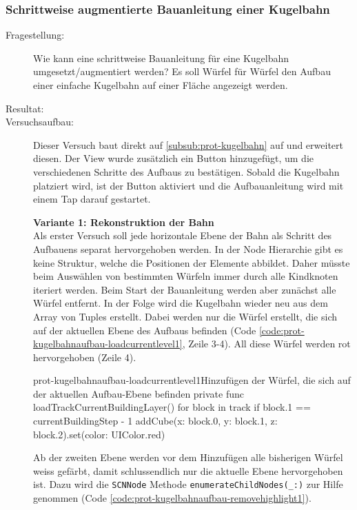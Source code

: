 \subsubsection{Schrittweise augmentierte Bauanleitung einer Kugelbahn}\label{subsub:prot-kugelbahnaufbau}
\begin{description}
	\item[Fragestellung:] Wie kann eine schrittweise Bauanleitung für eine Kugelbahn umgesetzt/augmentiert werden? Es soll Würfel für Würfel den Aufbau einer einfache Kugelbahn auf einer Fläche angezeigt werden.
	\item[Resultat:] 
	\item[Versuchsaufbau:] Dieser Versuch baut direkt auf \ref{subsub:prot-kugelbahn} auf und erweitert diesen. Der View wurde zusätzlich ein Button hinzugefügt, um die verschiedenen Schritte des Aufbaus zu bestätigen. Sobald die Kugelbahn platziert wird, ist der Button aktiviert und die Aufbauanleitung wird mit einem Tap darauf gestartet.

	\textbf{Variante 1: Rekonstruktion der Bahn}\\
	Als erster Versuch soll jede horizontale Ebene der Bahn als Schritt des Aufbauens separat hervorgehoben werden. In der Node Hierarchie gibt es keine Struktur, welche die Positionen der Elemente abbildet. Daher müsste beim Auswählen von bestimmten Würfeln immer durch alle Kindknoten iteriert werden. Beim Start der Bauanleitung werden aber zunächst alle Würfel entfernt. In der Folge wird die Kugelbahn wieder neu aus dem Array von Tuples erstellt. Dabei werden nur die Würfel erstellt, die sich auf der aktuellen Ebene des Aufbaus befinden (Code \ref{code:prot-kugelbahnaufbau-loadcurrentlevel1}, Zeile 3-4). All diese Würfel werden rot hervorgehoben (Zeile 4).

	\begin{code}{prot-kugelbahnaufbau-loadcurrentlevel1}{Hinzufügen der Würfel, die sich auf der aktuellen Aufbau-Ebene befinden}
		private func loadTrackCurrentBuildingLayer() {
			for block in track {
				if block.1 == currentBuildingStep - 1 {
					addCube(x: block.0, y: block.1, z: block.2).set(color: UIColor.red)
				}
			}
		}
	\end{code}

	Ab der zweiten Ebene werden vor dem Hinzufügen alle bisherigen Würfel weiss gefärbt, damit schlussendlich nur die aktuelle Ebene hervorgehoben ist. Dazu wird die \texttt{SCNNode} Methode \texttt{enumerateChildNodes(\_:)} zur Hilfe genommen (Code \ref{code:prot-kugelbahnaufbau-removehighlight1}).


\end{description}
